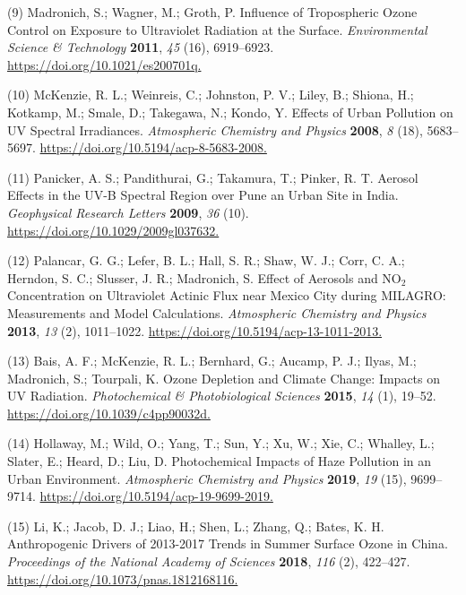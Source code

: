 \documentclass[10pt]{article}
\begin{document}
\label{csl:9}(9) Madronich, S.; Wagner, M.; Groth, P. {Influence of Tropospheric Ozone Control on Exposure to Ultraviolet Radiation at the Surface}. \textit{Environmental Science {\&} Technology} \textbf{2011}, \textit{45} (16), 6919–6923. \url{https://doi.org/10.1021/es200701q.}

\label{csl:10}(10) McKenzie, R. L.; Weinreis, C.; Johnston, P. V.; Liley, B.; Shiona, H.; Kotkamp, M.; Smale, D.; Takegawa, N.; Kondo, Y. {Effects of Urban Pollution on {UV} Spectral Irradiances}. \textit{Atmospheric Chemistry and Physics} \textbf{2008}, \textit{8} (18), 5683–5697. \url{https://doi.org/10.5194/acp-8-5683-2008.}

\label{csl:11}(11) Panicker, A. S.; Pandithurai, G.; Takamura, T.; Pinker, R. T. {Aerosol Effects in the {UV}-B Spectral Region over Pune an Urban Site in India}. \textit{Geophysical Research Letters} \textbf{2009}, \textit{36} (10). \url{https://doi.org/10.1029/2009gl037632.}

\label{csl:12}(12) Palancar, G. G.; Lefer, B. L.; Hall, S. R.; Shaw, W. J.; Corr, C. A.; Herndon, S. C.; Slusser, J. R.; Madronich, S. {Effect of Aerosols and NO$_{2}$ Concentration on Ultraviolet Actinic Flux near Mexico City during MILAGRO: Measurements and Model Calculations}. \textit{Atmospheric Chemistry and Physics} \textbf{2013}, \textit{13} (2), 1011–1022. \url{https://doi.org/10.5194/acp-13-1011-2013.}

\label{csl:13}(13) Bais, A. F.; McKenzie, R. L.; Bernhard, G.; Aucamp, P. J.; Ilyas, M.; Madronich, S.; Tourpali, K. {Ozone Depletion and Climate Change: Impacts on {UV} Radiation}. \textit{Photochemical {\&} Photobiological Sciences} \textbf{2015}, \textit{14} (1), 19–52. \url{https://doi.org/10.1039/c4pp90032d.}

\label{csl:14}(14) Hollaway, M.; Wild, O.; Yang, T.; Sun, Y.; Xu, W.; Xie, C.; Whalley, L.; Slater, E.; Heard, D.; Liu, D. {Photochemical Impacts of Haze Pollution in an Urban Environment}. \textit{Atmospheric Chemistry and Physics} \textbf{2019}, \textit{19} (15), 9699–9714. \url{https://doi.org/10.5194/acp-19-9699-2019.}

\label{csl:15}(15) Li, K.; Jacob, D. J.; Liao, H.; Shen, L.; Zhang, Q.; Bates, K. H. {Anthropogenic Drivers of 2013-2017 Trends in Summer Surface Ozone in China}. \textit{Proceedings of the National Academy of Sciences} \textbf{2018}, \textit{116} (2), 422–427. \url{https://doi.org/10.1073/pnas.1812168116.}
\end{document}

